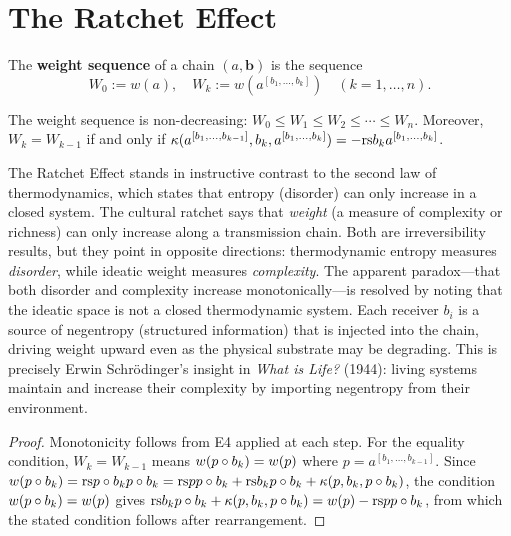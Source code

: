 \section{The Ratchet Effect}

\begin{definition}
\label{def:weight-sequence}
The \textbf{weight sequence} of a chain $(a, \mathbf{b})$ is the sequence
\[
  W_0 := w(a), \quad
  W_k := w(a^{[b_1, \ldots, b_k]}) \quad (k = 1, \ldots, n).
\]
\end{definition}

\begin{corollary}
\label{cor:ratchet}
The weight sequence is non-decreasing:
$W_0 \leq W_1 \leq W_2 \leq \cdots \leq W_n$.
Moreover, $W_k = W_{k-1}$ if and only if
$\kappa(a^{[b_1, \ldots, b_{k-1}]}, b_k, a^{[b_1, \ldots, b_k]}) = -\mathrm{rs}{b_k}{a^{[b_1,\ldots,b_k]}}$.
\end{corollary}

\begin{remark}
\label{rem:ch8:ratchet_entropy}
The Ratchet Effect stands in instructive contrast to the second law of
thermodynamics, which states that entropy (disorder) can only increase in
a closed system.  The cultural ratchet says that \emph{weight} (a measure
of complexity or richness) can only increase along a transmission chain.
Both are irreversibility results, but they point in opposite directions:
thermodynamic entropy measures \emph{disorder}, while ideatic weight measures
\emph{complexity}.  The apparent paradox---that both disorder and complexity
increase monotonically---is resolved by noting that the ideatic space is
not a closed thermodynamic system.  Each receiver $b_i$ is a source of
negentropy (structured information) that is injected into the chain,
driving weight upward even as the physical substrate may be degrading.
This is precisely Erwin Schr\"odinger's insight in \emph{What is Life?}
(1944): living systems maintain and increase their complexity by importing
negentropy from their environment.
\end{remark}



\begin{proof}
Monotonicity follows from E4 applied at each step.  For the equality
condition, $W_k = W_{k-1}$ means
$w(p \circ b_k) = w(p)$ where $p = a^{[b_1,\ldots,b_{k-1}]}$.
Since $w(p \circ b_k) = \mathrm{rs}{p \circ b_k}{p \circ b_k}
= \mathrm{rs}{p}{p \circ b_k} + \mathrm{rs}{b_k}{p \circ b_k}
  + \kappa(p, b_k, p \circ b_k)$,
the condition $w(p \circ b_k) = w(p)$ gives
$\mathrm{rs}{b_k}{p \circ b_k} + \kappa(p, b_k, p \circ b_k)
= w(p) - \mathrm{rs}{p}{p \circ b_k}$,
from which the stated condition follows after rearrangement.
\end{proof}

